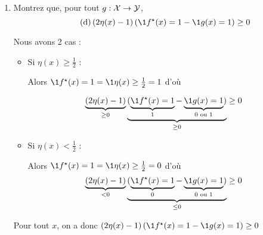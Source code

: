 {\begin{enumerate}
\begin{reponse}
\begin{align*}
				      =  & 2 \eta\left(x\right) (b\left( x\right) - a\left( x\right)) +\left(b\left( x\right)-a\left( x\right)\right)                                                                                                \\
				      =  & (2 \eta\left(x\right) - 1) (b\left( x\right) - a\left( x\right))                                                                                                                                          \\
				      =  & (2 \eta\left( x\right) - 1)(\1{f^{\star}(x) = 1} - \1{g(x) = 1})
			      \end{align*}
		      \end{reponse}

		\item Montrez que, pour tout $g:{\mathcal X}\to{\mathcal Y}$,
		      \begin{equation} \label{eq:d} \tag{d}
			      \left(2\eta(x)-1\right)\left(\1{f^{\star}(x)=1}-\1{g(x)=1}\right) \geq 0
		      \end{equation}

		      \begin{reponse}
			      Nous avons 2 cas :

			      \begin{itemize}
				      \item Si $\eta(x) \geq \frac{1}{2}$ :

				            Alors $\1{f^{\star}(x)=1} = \1{\eta(x) \geq \frac{1}{2}} = 1$ d'où

				            \begin{equation*}
					            \underbrace{(2 \eta(x)-1)}_{\geq 0} \underbrace{(\underbrace{\1{f^{\star}(x)=1}}_{1}-\underbrace{\1{g(x)=1}}_{0 \text{ ou } 1})}_{\geq 0} \geq 0
				            \end{equation*}

				      \item Si $\eta(x) < \frac{1}{2}$ :

				            Alors $\1{f^{\star}(x)=1} = \1{\eta(x) \geq \frac{1}{2}} = 0$ d'où
				            \begin{equation*}
					            \underbrace{(2 \eta(x)-1)}_{< 0} \underbrace{(\underbrace{\1{f^{\star}(x)=1}}_{0}-\underbrace{\1{g(x)=1}}_{0 \text{ ou } 1})}_{\leq 0} \geq 0
				            \end{equation*}
			      \end{itemize}

			      Pour tout $x$, on a donc $\left(2\eta(x)-1\right)\left(\1{f^{\star}(x)=1}-\1{g(x)=1}\right) \geq 0$
		      \end{reponse}


\end{enumerate}}
